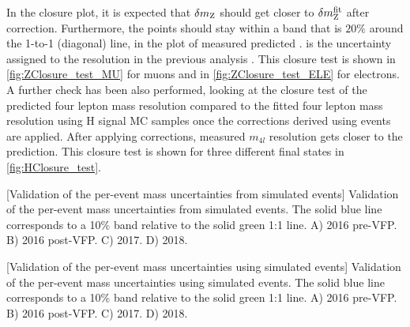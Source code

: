In the closure plot, it is expected that $\delta m_{\text{Z}}$ should get closer to $\delta m_{\text{Z}}^\text{fit}$ after correction.
Furthermore, the points should stay within a band that is $20\%$ around the 1-to-1 (diagonal) line, in the plot of measured \vs predicted \mZ.
is the uncertainty assigned to the resolution in the previous analysis \cite{HIG_16_041}. 
This closure test is shown in \cref{fig:ZClosure_test_MU} for muons and in \cref{fig:ZClosure_test_ELE} for electrons.
A further check has been also performed, looking at the closure test of the predicted four lepton mass 
resolution compared to the fitted four lepton mass resolution using H signal MC samples once the 
corrections derived using \PZ events are applied. After applying corrections, measured $m_{4l}$ 
resolution gets closer to the prediction. This closure test is shown for three different 
final states in \cref{fig:HClosure_test}.
\begin{multiFigure}
    \centering
        [Validation of the per-event mass uncertainties from simulated \ztomumu events]
        {Validation of the per-event mass uncertainties from simulated \ztomumu events.
        The solid blue line corresponds to a 10\% band relative to the solid green 1:1 line.
        \;A) 2016 pre-VFP.
        \;B) 2016 post-VFP.
        \;C) 2017.
        \;D) 2018.}
    \label{fig:ZClosure_test_MU}
\end{multiFigure}
\begin{multiFigure}
    \centering
        [Validation of the per-event mass uncertainties using simulated \ztoee events]
        {Validation of the per-event mass uncertainties using simulated \ztoee events.
        The solid blue line corresponds to a 10\% band relative to the solid green 1:1 line.
        \;A) 2016 pre-VFP.
        \;B) 2016 post-VFP.
        \;C) 2017.
        \;D) 2018.}
    \label{fig:ZClosure_test_ELE}
\end{multiFigure}

